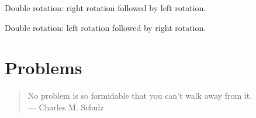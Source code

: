 \begin{algorithm}[!htbp]

\caption{Double rotation: right rotation followed by left rotation.}
\label{alg:tree_data_structures:right_left_rotation}
\end{algorithm}

\begin{algorithm}[!htbp]

\caption{Double rotation: left rotation followed by right rotation.}
\label{alg:tree_data_structures:right_left_rotation}
\end{algorithm}



\section{Problems}

\begin{quote}
\footnotesize
No problem is so formidable that you can't walk away from it. \\
\noindent
--- Charles M. Schulz
\end{quote}

